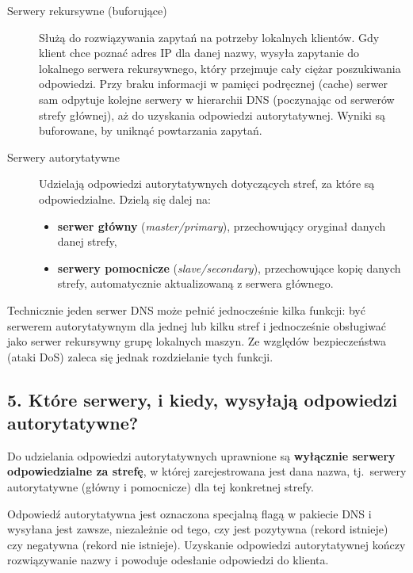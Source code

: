 \documentclass[12pt,a4paper]{article}
\begin{document}
\begin{description}
  \item[Serwery rekursywne (buforujące)]
        Służą do rozwiązywania zapytań na potrzeby lokalnych klientów. Gdy klient
        chce poznać adres IP dla danej nazwy, wysyła zapytanie do lokalnego serwera
        rekursywnego, który przejmuje cały ciężar poszukiwania odpowiedzi. Przy braku
        informacji w pamięci podręcznej (cache) serwer sam odpytuje kolejne serwery
        w hierarchii DNS (poczynając od serwerów strefy głównej), aż do uzyskania
        odpowiedzi autorytatywnej. Wyniki są buforowane, by uniknąć powtarzania
        zapytań.
  \item[Serwery autorytatywne]
        Udzielają odpowiedzi autorytatywnych dotyczących stref, za które są
        odpowiedzialne. Dzielą się dalej na:
        \begin{itemize}
          \item \textbf{serwer główny} (\emph{master/primary}), przechowujący
                oryginał danych danej strefy,
          \item \textbf{serwery pomocnicze} (\emph{slave/secondary}), przechowujące
                kopię danych strefy, automatycznie aktualizowaną z serwera głównego.
        \end{itemize}
\end{description}

Technicznie jeden serwer DNS może pełnić jednocześnie kilka funkcji: być serwerem
autorytatywnym dla jednej lub kilku stref i jednocześnie obsługiwać jako serwer
rekursywny grupę lokalnych maszyn. Ze względów bezpieczeństwa (ataki DoS) zaleca
się jednak rozdzielanie tych funkcji.

\subsection*{5. Które serwery, i kiedy, wysyłają odpowiedzi autorytatywne?}

Do udzielania odpowiedzi autorytatywnych uprawnione są \textbf{wyłącznie serwery
odpowiedzialne za strefę}, w której zarejestrowana jest dana nazwa, tj.\ serwery
autorytatywne (główny i pomocnicze) dla tej konkretnej strefy.

Odpowiedź autorytatywna jest oznaczona specjalną flagą w pakiecie DNS i wysyłana
jest zawsze, niezależnie od tego, czy jest pozytywna (rekord istnieje) czy
negatywna (rekord nie istnieje). Uzyskanie odpowiedzi autorytatywnej kończy
rozwiązywanie nazwy i powoduje odesłanie odpowiedzi do klienta.
\end{document}
